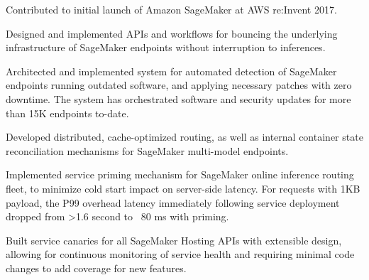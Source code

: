 \documentclass[]{deedy-resume-openfont}
\begin{document}
\begin{minipage}[t]{0.64\textwidth}
\minigap
{}
\vspace{\topsep} %
\begin{tightemize}
\item Contributed to initial launch of Amazon SageMaker at AWS re:Invent 2017.
\item Designed and implemented APIs and workflows for bouncing the underlying infrastructure of SageMaker endpoints without interruption to inferences.
\item Architected and implemented system for automated detection of SageMaker endpoints running outdated software, and applying necessary patches with zero downtime. The system has orchestrated software and security updates for more than 15K endpoints to-date.
\item Developed distributed, cache-optimized routing, as well as internal container state reconciliation mechanisms for SageMaker multi-model endpoints.
\item Implemented service priming mechanism for SageMaker online inference routing fleet, to minimize cold start impact on server-side latency. For requests with 1KB payload, the P99 overhead latency immediately following service deployment dropped from >1.6 second to ~80 ms with priming.
\item Built service canaries for all SageMaker Hosting APIs with extensible design, allowing for continuous monitoring of service health and requiring minimal code changes to add coverage for new features.
\end{tightemize}
\sectionsep


\end{minipage}
\end{document}
